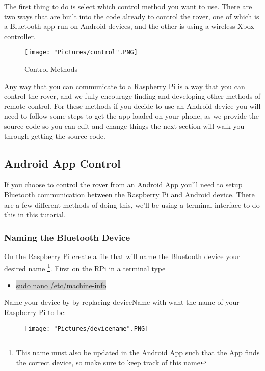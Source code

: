 \documentclass[12pt]{article}
\begin{document}
The first thing to do is select which control method you want to use. There are two ways that are built into the code already to control the rover, one of which is a Bluetooth app run on Android devices, and the other is using a wireless Xbox controller. 

\begin{figure}[H]
 	\centering
	\texttt{[image: "Pictures/control".PNG]}
 	\caption{Control Methods}
	\label{controls}
\end{figure}

\noindent Any way that you can communicate to a Raspberry Pi is a way that you can control the rover, and we fully encourage finding and developing other methods of remote control. For these methods if you decide to use an Android device you will need to follow some steps to get the app loaded on your phone, as we provide the source code so you can edit and change things the next section will walk you through getting the source code.

\subsection{Android App Control}
If you choose to control the rover from an Android App you'll need to setup Bluetooth communication between the Raspberry Pi and Android device. There are a few different methods of doing this, we'll be using a terminal interface to do this in this tutorial.

\subsubsection{Naming the Bluetooth Device}

On the Raspberry Pi create a file that will name the Bluetooth device your desired name \footnote{This name must also be updated in the Android App such that the App finds the correct device, so make sure to keep track of this name}. First on the RPi in a terminal type 
\begin{itemize}
	\item[] \colorbox{lightgray}{sudo nano /etc/machine-info} 
\end{itemize}
\noindent Name your device by by replacing deviceName with want the name of your Raspberry Pi to be:

\begin{figure}[H]
 	\centering
	\texttt{[image: "Pictures/devicename".PNG]}
\end{figure}
\end{document}
